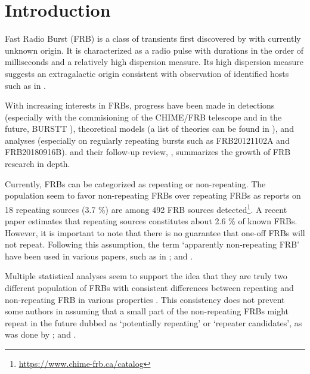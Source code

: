 \documentclass[reprint,amsmath,amssymb,showkeys,prd]{revtex4-2}
\begin{document}
\maketitle


\section{Introduction}

Fast Radio Burst (FRB) is a class of transients first discovered by \citet{lorimer_BrightMillisecondRadio_2007} with currently unknown origin.
It is characterized as a radio pulse with durations in the order of milliseconds and a relatively high dispersion measure.
Its high dispersion measure suggests an extragalactic origin consistent with observation of identified hosts such as in \citet{bannister_SingleFastRadio_2019, chatterjee_DirectLocalizationFast_2017, ravi_FastRadioBurst_2019}.

With increasing interests in FRBs, progress have been made in detections (especially with the commisioning of the CHIME/FRB telescope  \cite{thechimefrbcollaborationCHIMEFastRadio2018}  and in the future, BURSTT  \cite{lin_BURSTTBustlingUniverse_2022} ), theoretical models (a list of theories can be found in \citet{platts_LivingTheoryCatalogue_2019}), and analyses (especially on regularly repeating bursts such as FRB20121102A and FRB20180916B).
\citet{petroff_FastRadioBursts_2019} and their follow-up review, \citet{petroff_FastRadioBursts_2022}, summarizes the growth of FRB research in depth.

Currently, FRBs can be categorized as repeating or non-repeating.
The population seem to favor non-repeating FRBs over repeating FRBs as \cite{thechimefrbcollaborationCHIMEFastRadio2018} reports on 18 repeating sources (3.7 \%) are among 492 FRB sources detected\footnote{\url{https://www.chime-frb.ca/catalog}}.
A recent paper  \cite{andersen_CHIMEFRBDiscovery_2023}  estimates that repeating sources constitutes about 2.6 \% of known FRBs.
However, it is important to note that there is no guarantee that one-off FRBs will not repeat.
Following this assumption, the term `apparently non-repeating FRB' have been used in various papers, such as in \citet{cui_FastRadioBursts_2021, cui_StatisticalPropertiesFast_2021}; and \citet{katz_AbsencePeriodicityRepeating_2022}.

Multiple statistical analyses seem to support the idea that they are truly two different population of FRBs with consistent differences between repeating and non-repeating FRB in various properties \cite{cui_FastRadioBursts_2021, chen_OneoffRepeatingFast_2022, zhang_StatisticalSimilarityRepeating_2022} .
This consistency does not prevent some authors in assuming that a small part of the non-repeating FRBs might repeat in the future dubbed as `potentially repeating' or `repeater candidates', as was done by \citet{bohanchen_UncloakingHiddenRepeating_2021, luo_MachineLearningClassification_2022, zhu-ge_MachineLearningClassification_2022}; and \citet{pleunis_FastRadioBurst_2021}.
\end{document}
